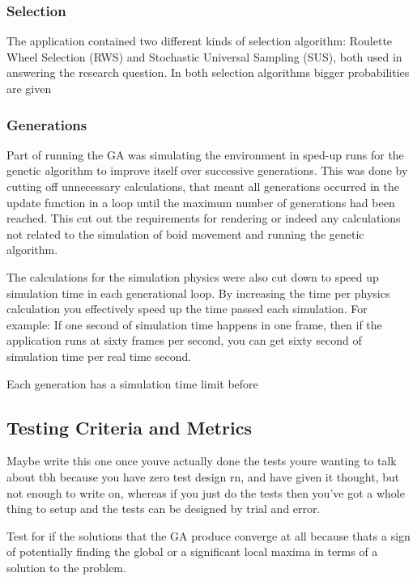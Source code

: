 \subsubsection{Selection}
The application contained two different kinds of selection algorithm: Roulette Wheel Selection (RWS) and Stochastic Universal Sampling (SUS), both used in answering the research question. In both selection algorithms bigger probabilities are given 


\subsubsection{Generations}
Part of running the GA was simulating the environment in sped-up runs for the genetic algorithm to improve itself over successive generations. This was done by cutting off unnecessary calculations, that meant all generations occurred in the update function in a loop until the maximum number of generations had been reached. This cut out the requirements for rendering or indeed any calculations not related to the simulation of boid movement and running the genetic algorithm.

The calculations for the simulation physics were also cut down to speed up simulation time in each generational loop. By increasing the time per physics calculation you effectively speed up the time passed each simulation. For example: If one second of simulation time happens in one frame, then if the application runs at sixty frames per second, you can get sixty second of simulation time per real time second.

Each generation has a simulation time limit before



\subsection{Testing Criteria and Metrics}
Maybe write this one once youve actually done the tests youre wanting to talk about tbh because you have zero test design rn, and have given it thought, but not enough to write on, whereas if you just do the tests then you've got a whole thing to setup and the tests can be designed by trial and error. 

Test for if the solutions that the GA produce converge at all because thats a sign of potentially finding the global or a significant local maxima in terms of a solution to the problem.
















